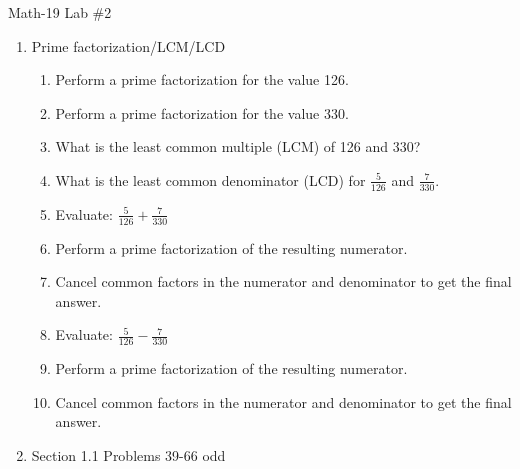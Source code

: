 \documentclass[letterpaper,12pt,fleqn]{article}
\begin{document}
\begin{center}
\Large Math-19 Lab \#2
\end{center}

\vspace{0.5in}

\begin{enumerate}
\item Prime factorization/LCM/LCD
\begin{enumerate}
\item Perform a prime factorization for the value 126.
\item Perform a prime factorization for the value 330.
\item What is the least common multiple (LCM) of 126 and 330?
\item What is the least common denominator (LCD) for $\frac{5}{126}$ and
$\frac{7}{330}$.
\item Evaluate: $\frac{5}{126}+\frac{7}{330}$
\item Perform a prime factorization of the resulting numerator.
\item Cancel common factors in the numerator and denominator to get the final
answer.
\item Evaluate: $\frac{5}{126}-\frac{7}{330}$
\item Perform a prime factorization of the resulting numerator.
\item Cancel common factors in the numerator and denominator to get the final
answer.
\end{enumerate}

\item Section 1.1 Problems 39-66 odd
\end{enumerate}
\end{document}
